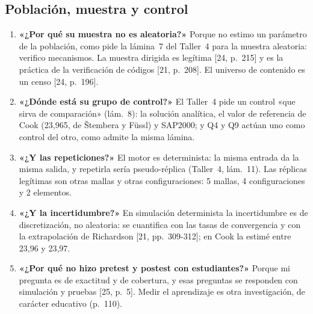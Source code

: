 \documentclass[11pt,a4paper]{article}
\begin{document}
\subsection{Población, muestra y control}
\begin{enumerate}[resume*=preg]
\item \textbf{«¿Por qué su muestra no es aleatoria?»} Porque no estimo un parámetro de la población, como pide la lámina~7 del Taller~4 para la muestra aleatoria: verifico mecanismos. La muestra dirigida es legítima [24, p.~215] y es la práctica de la verificación de códigos [21, p.~208]. El universo de contenido es un censo [24, p.~196].
\item \textbf{«¿Dónde está su grupo de control?»} El Taller~4 pide un control «que sirva de comparación» (lám.~8): la solución analítica, el valor de referencia de Cook (23,965, de Štembera y Füssl) y SAP2000; y Q4 y Q9 actúan uno como control del otro, como admite la misma lámina.
\item \textbf{«¿Y las repeticiones?»} El motor es determinista: la misma entrada da la misma salida, y repetirla sería pseudo-réplica (Taller~4, lám.~11). Las réplicas legítimas son otras mallas y otras configuraciones: 5 mallas, 4 configuraciones y 2 elementos.
\item \textbf{«¿Y la incertidumbre?»} En simulación determinista la incertidumbre es de discretización, no aleatoria: se cuantifica con las tasas de convergencia y con la extrapolación de Richardson [21, pp.~309-312]; en Cook la estimé entre 23,96 y 23,97.
\item \textbf{«¿Por qué no hizo pretest y postest con estudiantes?»} Porque mi pregunta es de exactitud y de cobertura, y esas preguntas se responden con simulación y pruebas [25, p.~5]. Medir el aprendizaje es otra investigación, de carácter educativo (p.~110).
\end{enumerate}
\end{document}
